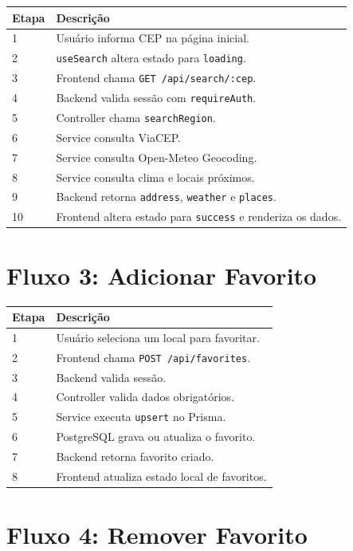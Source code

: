 \documentclass[
    12pt,
    oneside,
    openright,
    a4paper,
    english,
    brazil
]{abntex2}
\begin{document}
\begin{longtable}{|p{2cm}|p{12cm}|}
\hline
\textbf{Etapa} & \textbf{Descrição} \\
\hline
1 & Usuário informa CEP na página inicial. \\
\hline
2 & \texttt{useSearch} altera estado para \texttt{loading}. \\
\hline
3 & Frontend chama \texttt{GET /api/search/:cep}. \\
\hline
4 & Backend valida sessão com \texttt{requireAuth}. \\
\hline
5 & Controller chama \texttt{searchRegion}. \\
\hline
6 & Service consulta ViaCEP. \\
\hline
7 & Service consulta Open-Meteo Geocoding. \\
\hline
8 & Service consulta clima e locais próximos. \\
\hline
9 & Backend retorna \texttt{address}, \texttt{weather} e \texttt{places}. \\
\hline
10 & Frontend altera estado para \texttt{success} e renderiza os dados. \\
\hline
\end{longtable}

\section{Fluxo 3: Adicionar Favorito}

\begin{longtable}{|p{2cm}|p{12cm}|}
\hline
\textbf{Etapa} & \textbf{Descrição} \\
\hline
1 & Usuário seleciona um local para favoritar. \\
\hline
2 & Frontend chama \texttt{POST /api/favorites}. \\
\hline
3 & Backend valida sessão. \\
\hline
4 & Controller valida dados obrigatórios. \\
\hline
5 & Service executa \texttt{upsert} no Prisma. \\
\hline
6 & PostgreSQL grava ou atualiza o favorito. \\
\hline
7 & Backend retorna favorito criado. \\
\hline
8 & Frontend atualiza estado local de favoritos. \\
\hline
\end{longtable}

\section{Fluxo 4: Remover Favorito}
\end{document}

